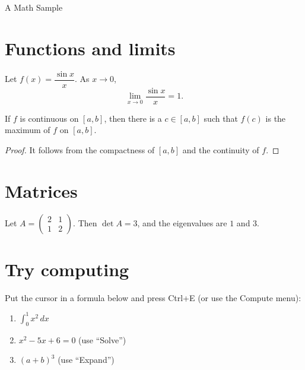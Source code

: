 
\begin{center}{\Large A Math Sample}\end{center}

\section{Functions and limits}
Let $f(x)=\dfrac{\sin x}{x}$. As $x\to 0$,
\[\lim_{x\to 0}\frac{\sin x}{x}=1.\]

\begin{theorem}
If $f$ is continuous on $[a,b]$, then there is a $c\in[a,b]$ such that $f(c)$ is the maximum of $f$ on $[a,b]$.
\end{theorem}

\begin{proof}
It follows from the compactness of $[a,b]$ and the continuity of $f$.
\end{proof}

\section{Matrices}
Let $A=\begin{pmatrix}2&1\\1&2\end{pmatrix}$. Then $\det A=3$, and the eigenvalues are $1$ and $3$.

\section{Try computing}
Put the cursor in a formula below and press Ctrl+E (or use the Compute menu):
\begin{enumerate}
\item $\int_0^1 x^2\,dx$
\item $x^2-5x+6=0$ (use ``Solve'')
\item $(a+b)^3$ (use ``Expand'')
\end{enumerate}
